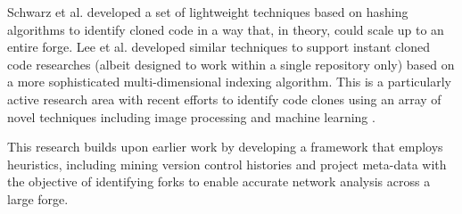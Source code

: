 Schwarz et al. \citep{schwarz2012often} developed a set of lightweight techniques based on hashing algorithms to identify cloned code in a way that, in theory, could  scale up to an entire forge. Lee et al. \citep{lee2010instant} developed similar techniques to support instant cloned code researches (albeit designed to work within a single repository only) based on a more sophisticated multi-dimensional indexing algorithm. This is a particularly active research area with recent efforts to identify code clones using an array of novel techniques including image processing and machine learning \citep{ghofrani2017conceptual, ragkhitwetsagul2018picture}.

This research builds upon earlier work by developing a framework that employs heuristics, including mining version control histories and project meta-data with the objective of identifying forks to enable accurate network analysis across a large forge.
